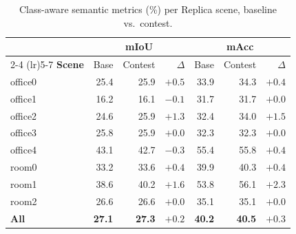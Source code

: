 \begin{table}[ht]
  \centering
  \small
  \renewcommand{\arraystretch}{1.2}
  \begin{tabular}{@{}l r r r r r r@{}}
    \toprule
    & \multicolumn{3}{c}{\textbf{mIoU}} & \multicolumn{3}{c}{\textbf{mAcc}} \\
    \cmidrule(lr){2-4} \cmidrule(lr){5-7}
    \textbf{Scene} & Base & Contest & $\Delta$ & Base & Contest & $\Delta$ \\
    \midrule
    office0 & 25.4 & 25.9 & $+0.5$ & 33.9 & 34.3 & $+0.4$ \\
    office1 & 16.2 & 16.1 & $-0.1$ & 31.7 & 31.7 & $+0.0$ \\
    office2 & 24.6 & 25.9 & $+1.3$ & 32.4 & 34.0 & $+1.5$ \\
    office3 & 25.8 & 25.9 & $+0.0$ & 32.3 & 32.3 & $+0.0$ \\
    office4 & 43.1 & 42.7 & $-0.3$ & 55.4 & 55.8 & $+0.4$ \\
    room0   & 33.2 & 33.6 & $+0.4$ & 39.9 & 40.3 & $+0.4$ \\
    room1   & 38.6 & 40.2 & $+1.6$ & 53.8 & 56.1 & $+2.3$ \\
    room2   & 26.6 & 26.6 & $+0.0$ & 35.1 & 35.1 & $+0.0$ \\
    \midrule
    \textbf{All} & \textbf{27.1} & \textbf{27.3} & $\mathbf{+0.2}$ & \textbf{40.2} & \textbf{40.5} & $\mathbf{+0.3}$ \\
    \bottomrule
  \end{tabular}
  \caption{Class-aware semantic metrics (\%) per Replica scene, baseline vs.\ contest.}
  \label{tab:contest_semantic}
\end{table}
%
%
%
